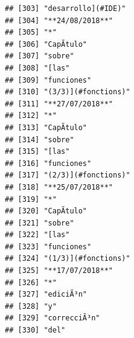 \documentclass[
]{book}
\begin{document}
\begin{verbatim}
## [303] "desarrollo](#IDE)"                                                                
## [304] "**24/08/2018**"                                                                   
## [305] "*"                                                                                
## [306] "CapÃ­tulo"                                                                        
## [307] "sobre"                                                                            
## [308] "[las"                                                                             
## [309] "funciones"                                                                        
## [310] "(3/3)](#fonctions)"                                                               
## [311] "**27/07/2018**"                                                                   
## [312] "*"                                                                                
## [313] "CapÃ­tulo"                                                                        
## [314] "sobre"                                                                            
## [315] "[las"                                                                             
## [316] "funciones"                                                                        
## [317] "(2/3)](#fonctions)"                                                               
## [318] "**25/07/2018**"                                                                   
## [319] "*"                                                                                
## [320] "CapÃ­tulo"                                                                        
## [321] "sobre"                                                                            
## [322] "[las"                                                                             
## [323] "funciones"                                                                        
## [324] "(1/3)](#fonctions)"                                                               
## [325] "**17/07/2018**"                                                                   
## [326] "*"                                                                                
## [327] "ediciÃ³n"                                                                         
## [328] "y"                                                                                
## [329] "correcciÃ³n"                                                                      
## [330] "del"                                                                              

\end{verbatim}
\end{document}
